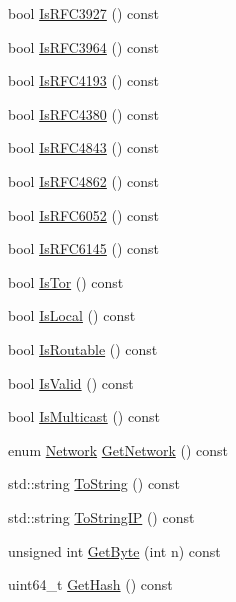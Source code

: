 \begin{DoxyCompactItemize}
\item 
bool \hyperlink{class_c_net_addr_a3d8e5495fd3a2f92bedf272452a2d4b0}{Is\+R\+F\+C3927} () const 
\item 
bool \hyperlink{class_c_net_addr_a312065a9243977a602412665d6148f26}{Is\+R\+F\+C3964} () const 
\item 
bool \hyperlink{class_c_net_addr_ac47bf0c27f8026497b1933393a6570ba}{Is\+R\+F\+C4193} () const 
\item 
bool \hyperlink{class_c_net_addr_afc6e370bb97c97f83260bba898ec4731}{Is\+R\+F\+C4380} () const 
\item 
bool \hyperlink{class_c_net_addr_ad69e51fffff5ee9fcabedda51f10a3ce}{Is\+R\+F\+C4843} () const 
\item 
bool \hyperlink{class_c_net_addr_a5cba67eb628ea99ea68addfe14913fa3}{Is\+R\+F\+C4862} () const 
\item 
bool \hyperlink{class_c_net_addr_a8057dbecf9f5b4d33a643990b6eec873}{Is\+R\+F\+C6052} () const 
\item 
bool \hyperlink{class_c_net_addr_ab5d91a88d77777004c8ebd658c8caf54}{Is\+R\+F\+C6145} () const 
\item 
bool \hyperlink{class_c_net_addr_a3fba9e0b18f531c0ed15794a30e8165d}{Is\+Tor} () const 
\item 
bool \hyperlink{class_c_net_addr_a6cfa18f323424408cf7ace36c9a7c2e2}{Is\+Local} () const 
\item 
bool \hyperlink{class_c_net_addr_a35131b2792434d1c9a860c583b610ab6}{Is\+Routable} () const 
\item 
bool \hyperlink{class_c_net_addr_a52a1b506f07e5450057e12a8b5a7fbcd}{Is\+Valid} () const 
\item 
bool \hyperlink{class_c_net_addr_ab6593d2d75ca7cc6f00c2831cc0a8b73}{Is\+Multicast} () const 
\item 
enum \hyperlink{netbase_8h_acc9a38c714afe79b5035cb36f560dac3}{Network} \hyperlink{class_c_net_addr_a34a4760424f5c51998fc3baf82ccb5c8}{Get\+Network} () const 
\item 
std\+::string \hyperlink{class_c_net_addr_aae906cecdba331389f249a64693895b6}{To\+String} () const 
\item 
std\+::string \hyperlink{class_c_net_addr_a7ec845c27b63853fb0db08a4d154266f}{To\+String\+I\+P} () const 
\item 
unsigned int \hyperlink{class_c_net_addr_a0793d30a6baae6e3d4e06084ec33eddd}{Get\+Byte} (int n) const 
\item 
uint64\+\_\+t \hyperlink{class_c_net_addr_a4c94fea8695ef97adf5b2a18e1074308}{Get\+Hash} () const 

\end{DoxyCompactItemize}
